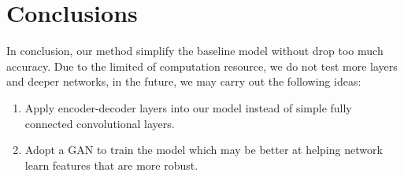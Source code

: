 \documentclass[final]{cvpr}
\begin{document}
\section{Conclusions}
In conclusion, our method simplify the baseline model without drop too much accuracy. Due to the limited of computation resource, we do not test more layers and deeper networks, in the future, we may carry out the following ideas:
\begin{enumerate}
\item Apply encoder-decoder layers into our model instead of simple fully connected convolutional layers.
\item Adopt a GAN to train the model which may be better at helping network learn features that are more robust. 
\end{enumerate}




\end{document}
